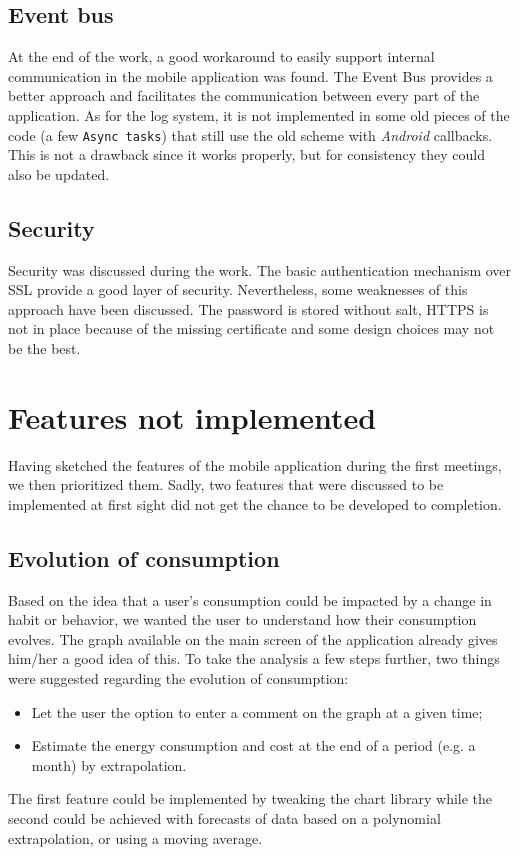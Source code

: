 \documentclass[a4paper, oneside, 11pt]{book}
\begin{document}
\subsection{Event bus}
At the end of the work, a good workaround to easily support internal communication in the mobile application was found. The Event Bus provides a better approach and facilitates the communication between every part of the application. As for the log system, it is not implemented in some old pieces of the code (a few \texttt{Async tasks}) that still use the old scheme with \textit{Android} callbacks. This is not a drawback since it works properly, but for consistency they could also be updated.

\subsection{Security}
Security was discussed during the work. The basic authentication mechanism over SSL provide a good layer of security. Nevertheless, some weaknesses of this approach have been discussed. The password is stored without salt, HTTPS is not in place because of the missing certificate and some design choices may not be the best. 

\section{Features not implemented}
Having sketched the features of the mobile application during the first meetings, we then prioritized them. Sadly, two features that were discussed to be implemented at first sight did not get the chance to be developed to completion. 

\subsection{Evolution of consumption}
Based on the idea that a user’s consumption could be impacted by a change in habit or behavior, we wanted the user to understand how their consumption evolves. The graph available on the main screen of the application already gives him/her a good idea of this. To take the analysis a few steps further, two things were suggested regarding the evolution of consumption: 
\begin{itemize}
	\item Let the user the option to enter a comment on the graph at a given time;
	\item Estimate the energy consumption and cost at the end of a period (e.g. a month) by extrapolation.
\end{itemize}
The first feature could be implemented by tweaking the chart library while the second could be achieved with forecasts of data based on a polynomial extrapolation, or using a moving average.
\end{document}
